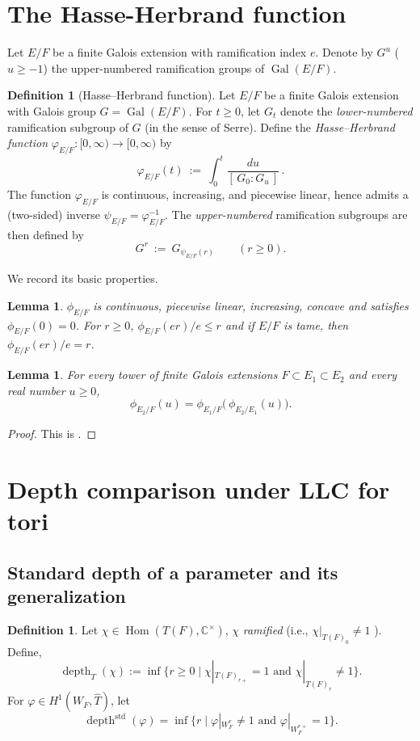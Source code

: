 \documentclass[american]{article}
\newcommand{\depthstd}{\operatorname{depth}^{\mathrm{std}}}
\numberwithin{equation}{section}
\numberwithin{figure}{section}
\theoremstyle{plain}
\newtheorem{lemma}[theorem]{Lemma}
\theoremstyle{definition}
\newtheorem{definition}[theorem]{Definition}
\theoremstyle{remark}
\DeclareMathOperator{\Hom}{Hom}
\DeclareMathOperator{\depth}{depth}
\DeclareMathOperator{\Gal}{Gal}
\newcommand{\CC}{\mathbb{C}}
\begin{document}
\section{The Hasse-Herbrand function}
\label{sec:hasse-herbrand}

Let $E/F$ be a finite Galois extension with ramification index $e$. Denote by $G^{u}$ ($u\ge-1$) the upper-numbered ramification groups of $\Gal(E/F)$. 

\begin{definition}[Hasse--Herbrand function]\label{def:hasse-herbrand}
Let $E/F$ be a finite Galois extension with Galois group $G=\Gal(E/F)$.
For $t\ge 0$, let $G_t$ denote the \emph{lower-numbered} ramification subgroup of $G$
(in the sense of Serre).
Define the \emph{Hasse--Herbrand function} $\varphi_{E/F}:[0,\infty)\to[0,\infty)$ by
\[
\varphi_{E/F}(t)\ :=\ \int_{0}^{t}\frac{du}{[\,G_0:G_u\,]}\,.
\]
The function $\varphi_{E/F}$ is continuous, increasing, and piecewise linear, hence admits
a (two-sided) inverse $\psi_{E/F}=\varphi_{E/F}^{-1}$.
The \emph{upper-numbered} ramification subgroups are then defined by
\[
G^{r}\ :=\ G_{\psi_{E/F}(r)}\qquad (r\ge 0).
\]
\end{definition}

We record its basic properties.

\begin{lemma}\label{lem:HH} 
$\phi_{E/F}$ is continuous, piecewise linear, increasing, concave and satisfies $\phi_{E/F}(0)=0$. For \(r\geq 0\), \(\phi_{E/F}(er)/e \leq r\)  and if  \(E/F\)  is tame, then $\phi_{E/F}(er)/e=r$. 
\end{lemma}

\begin{lemma}
\label{lem:HH-tower}
For every tower of finite Galois extensions $F\subset E_1\subset E_2$ and every real number $u\ge0$,
\[
   \phi_{E_2/F}(u) = \phi_{E_1/F}\!\bigl(\,\phi_{E_2/E_1}(u)\bigr).
\tag{$\ast$}
\]
\end{lemma}

\begin{proof}
This is \cite[IV.\S 3, Prop.~15]{SerreLocal}.
\end{proof}

\section{Depth comparison under LLC for tori}
\label{sec:depth-theorem}
\subsection{Standard depth of a parameter and its generalization}
\begin{definition} 
Let $\chi\in\Hom(T(F),\CC^{\times})$,  \(\chi\)  \emph{ramified} (i.e.,  \(\chi|_{T(F)_0}\neq1\) ). Define,
\[
\depth_{T}(\chi):=\inf\bigl\{ r\ge0\mid\chi|_{T(F)_{r+}}=1 \text{ and } \chi|_{T(F)_{r}}\neq1\bigr\}.
\]
For $\varphi \in H^1(W_F,\widehat{T})$, let
\[\depthstd(\varphi)=\inf\bigl\{r \mid \varphi|_{W_F^r }\neq 1 \text{ and } \varphi|_{W_F^{r+}}=1 \bigr\}.\]
\end{definition}
\end{document}

